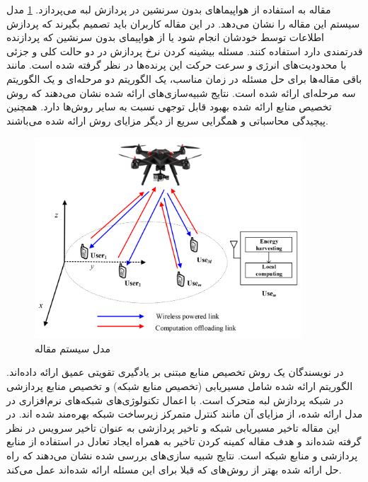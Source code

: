     مقاله \cite{zhou2018computation} به استفاده از هواپیما‌های بدون سرنشین  در پردازش لبه می‌پردازد.
    \cref{fig:chapter_2:system_model_zhou2018computation} مدل سیستم این مقاله را نشان می‌دهد.
    در این مقاله کاربران باید تصمیم بگیرند که پردازش اطلاعات توسط خودشان انجام شود یا از هواپیمای بدون سرنشین که پردازنده قدرتمندی دارد استفاده کنند.
    مسئله بیشینه کردن نرخ پردازش در دو حالت کلی و جزئی با محدودیت‌های انرژی و سرعت حرکت این پرنده‌ها در نظر گرفته شده است.
    مانند باقی مقاله‌ها برای حل مسئله در زمان مناسب، یک الگوریتم دو مرحله‌ای و یک الگوریتم سه مرحله‌ای ارائه شده است.
    نتایج شبیه‌سازی‌های ارائه شده نشان می‌دهند که روش تخصیص منابع ارائه شده بهبود قابل توجهی نسبت به سایر روش‌ها دارد.
    همچنین پیچیدگی محاسباتی و همگرایی سریع از دیگر مزایای روش ارائه شده می‌باشند.

    \begin{figure}[h]
      \centerline{\includegraphics[width=10cm]{graphics/chapter_2/system_model_zhou2018computation}}
      \caption{مدل سیستم مقاله \cite{zhou2018computation}}
      \label{fig:chapter_2:system_model_zhou2018computation}
    \end{figure}

    در \cite{wang2019smart} نویسندگان یک روش تخصیص منابع مبتنی بر یادگیری تقویتی عمیق ارائه داده‌اند.
    الگوریتم ارائه شده شامل مسیریابی (تخصیص منابع شبکه) و تخصیص منابع پردازشی در شبکه پردازش لبه متحرک است.
    با اعمال تکنولوژی‌های شبکه‌های نرم‌افزاری در مدل ارائه شده، از مزایای آن مانند کنترل متمرکز زیرساخت شبکه بهره‌مند شده اند.
    در این مقاله تاخیر مسیریابی شبکه و تاخیر پردازشی به عنوان تاخیر سرویس در نظر گرفته شده‌اند و هدف مقاله کمینه کردن تاخیر به همراه ایجاد تعادل در استفاده از منابع پردازشی و منابع شبکه است.
    نتایج شبیه سازی‌های بررسی شده نشان می‌دهند که راه حل ارائه شده بهتر از روش‌های که قبلا برای این مسئله ارائه شده‌اند عمل می‌کند.
